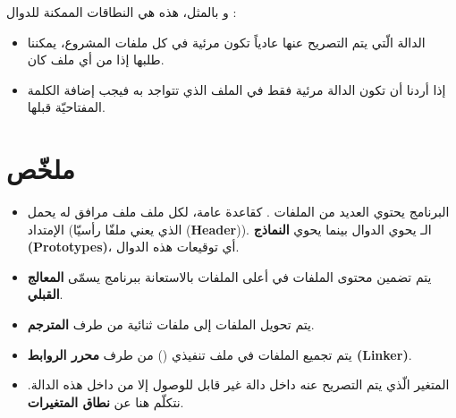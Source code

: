 و بالمثل، هذه هي النطاقات الممكنة للدوال :

\begin{itemize}
  \item الدالة الّتي يتم التصريح عنها عادياً تكون مرئية في كل ملفات المشروع، يمكننا طلبها إذا من أي ملف كان.
  \item إذا أردنا أن تكون الدالة مرئية فقط في الملف الذي تتواجد به فيجب إضافة الكلمة المفتاحيّة
قبلها.
\end{itemize}

\section*{ملخّص}

\begin{itemize}
  \item البرنامج يحتوي العديد من الملفات
.
كقاعدة عامة، لكل ملف
ملف مرافق له يحمل الإمتداد
(الذي يعني ملفّا رأسيّا
(\textbf{\textenglish{Header}})).
الـ
يحوي الدوال بينما
يحوي
\textbf{النماذج (\textenglish{Prototypes})}،
أي توقيعات هذه الدوال.
  \item يتم تضمين محتوى الملفات
في أعلى الملفات
بالاستعانة ببرنامج يسمّى
\textbf{المعالج القبلي}.
  \item يتم تحويل الملفات
إلى ملفات ثنائية
من طرف
\textbf{المترجم}.
  \item يتم تجميع الملفات
في ملف تنفيذي
()
من طرف
\textbf{محرر الروابط
(\textenglish{Linker})}.
  \item المتغير الّذي يتم التصريح عنه داخل دالة غير قابل للوصول إلا من داخل هذه الدالة. نتكلّم هنا عن
\textbf{نطاق المتغيرات}.
\end{itemize}
